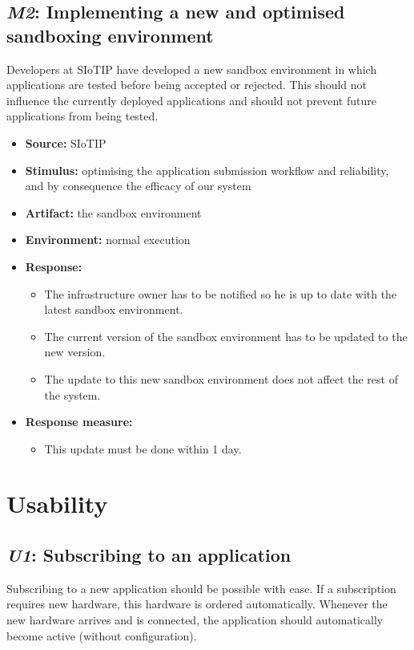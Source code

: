 \subsection{\emph{M2}: Implementing a new and optimised sandboxing environment}
Developers at SIoTIP have developed a new sandbox environment in which applications are tested before being accepted or rejected. This should not influence the currently deployed applications and should not prevent future applications from being tested.
\begin{itemize}
    \item \textbf{Source:} SIoTIP
    \item \textbf{Stimulus:} optimising the application submission workflow and reliability, and by consequence the efficacy of our system 
    \item \textbf{Artifact:} the sandbox environment
    \item \textbf{Environment:} normal execution
    \item \textbf{Response:}
        \begin{itemize}
        	\item The infrastructure owner has to be notified so he is up to date with the latest sandbox environment.
            \item The current version of the sandbox environment has to be updated to the new version.
            \item The update to this new sandbox environment does not affect the rest of the system.
        \end{itemize}

    \item \textbf{Response measure:}
        \begin{itemize}
            \item This update must be done within 1 day.
        \end{itemize}
\end{itemize}

\section{Usability}
\subsection{\emph{U1}: Subscribing to an application}
Subscribing to a new application should be possible with ease. If a subscription requires new hardware, this hardware is ordered automatically. Whenever the new hardware arrives and is connected, the application should automatically become active (without configuration).


